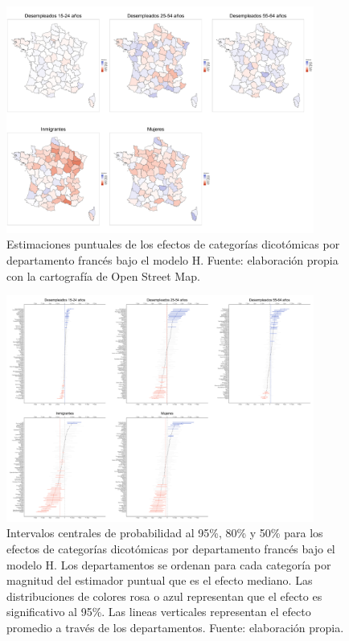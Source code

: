 \begin{figure}
	\centering
	\includegraphics[width = 0.9\textwidth]{Figs/Efectos/Mapa_Efectos_Dicotom_Modelo_H}
	\caption{Estimaciones puntuales de los efectos de categorías dicotómicas por departamento francés bajo el modelo H. Fuente: elaboración propia con la cartografía de Open Street Map.}
	\label{fig:Mapa_Efectos_Dicotom}
\end{figure}

\begin{figure}
	\centering
	\includegraphics[width = 0.9\textwidth]{Figs/Efectos/Efectos_Dicotom_Modelo_H}
	\caption{Intervalos centrales de probabilidad al 95\%, 80\% y 50\% para los efectos de categorías dicotómicas por departamento francés bajo el modelo H. Los departamentos se ordenan para cada categoría por magnitud del estimador puntual que es el efecto mediano. Las distribuciones de colores rosa o azul representan que el efecto es significativo al 95\%. Las lineas verticales representan el efecto promedio a través de los departamentos. Fuente: elaboración propia.}
	\label{fig:Efectos_Dicotom}
\end{figure}

